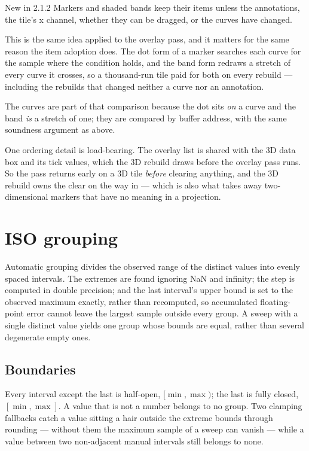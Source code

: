 \documentclass[11pt,a4paper,oneside]{report}
\newcommand{\appver}{2.1.2}
\begin{document}
\begin{aoenew}{New in \appver}
Markers and shaded bands keep their items unless the annotations, the tile's x
channel, whether they can be dragged, or the curves have changed.
\end{aoenew}

This is the same idea applied to the overlay pass, and it matters for the same
reason the item adoption does. The dot form of a marker searches each curve for
the sample where the condition holds, and the band form redraws a stretch of
every curve it crosses, so a thousand-run tile paid for both on every rebuild
--- including the rebuilds that changed neither a curve nor an annotation.

The curves are part of that comparison because the dot sits \emph{on} a curve
and the band \emph{is} a stretch of one; they are compared by buffer address,
with the same soundness argument as above.

One ordering detail is load-bearing. The overlay list is shared with the 3D data
box and its tick values, which the 3D rebuild draws before the overlay pass
runs. So the pass returns early on a 3D tile \emph{before} clearing anything,
and the 3D rebuild owns the clear on the way in --- which is also what takes
away two-dimensional markers that have no meaning in a projection.

\section{ISO grouping}

Automatic grouping divides the observed range of the distinct values into evenly
spaced intervals. The extremes are found ignoring NaN and infinity; the step is
computed in double precision; and the last interval's upper bound is set to the
observed maximum exactly, rather than recomputed, so accumulated floating-point
error cannot leave the largest sample outside every group. A sweep with a single
distinct value yields one group whose bounds are equal, rather than several
degenerate empty ones.

\subsection{Boundaries}

Every interval except the last is half-open, $[\min, \max)$; the last is fully
closed, $[\min, \max]$. A value that is not a number belongs to no group. Two
clamping fallbacks catch a value sitting a hair outside the extreme bounds
through rounding --- without them the maximum sample of a sweep can vanish ---
while a value between two non-adjacent manual intervals still belongs to none.
\end{document}
